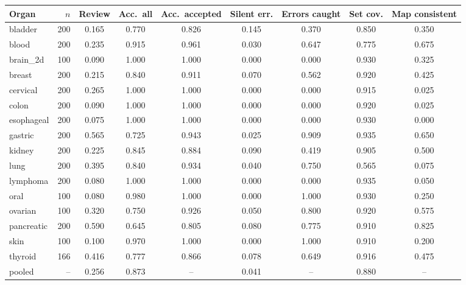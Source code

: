 \begin{tabular}{@{}lrccccccc@{}}
\toprule
Organ & $n$ & Review & Acc.\ all & Acc.\ accepted & Silent err. & Errors caught & Set cov. & Map consistent \\
\midrule
bladder & 200 & 0.165 & 0.770 & 0.826 & 0.145 & 0.370 & 0.850 & 0.350 \\
blood & 200 & 0.235 & 0.915 & 0.961 & 0.030 & 0.647 & 0.775 & 0.675 \\
brain\_2d & 100 & 0.090 & 1.000 & 1.000 & 0.000 & 0.000 & 0.930 & 0.325 \\
breast & 200 & 0.215 & 0.840 & 0.911 & 0.070 & 0.562 & 0.920 & 0.425 \\
cervical & 200 & 0.265 & 1.000 & 1.000 & 0.000 & 0.000 & 0.915 & 0.025 \\
colon & 200 & 0.090 & 1.000 & 1.000 & 0.000 & 0.000 & 0.920 & 0.025 \\
esophageal & 200 & 0.075 & 1.000 & 1.000 & 0.000 & 0.000 & 0.930 & 0.000 \\
gastric & 200 & 0.565 & 0.725 & 0.943 & 0.025 & 0.909 & 0.935 & 0.650 \\
kidney & 200 & 0.225 & 0.845 & 0.884 & 0.090 & 0.419 & 0.905 & 0.500 \\
lung & 200 & 0.395 & 0.840 & 0.934 & 0.040 & 0.750 & 0.565 & 0.075 \\
lymphoma & 200 & 0.080 & 1.000 & 1.000 & 0.000 & 0.000 & 0.935 & 0.050 \\
oral & 100 & 0.080 & 0.980 & 1.000 & 0.000 & 1.000 & 0.930 & 0.250 \\
ovarian & 100 & 0.320 & 0.750 & 0.926 & 0.050 & 0.800 & 0.920 & 0.575 \\
pancreatic & 200 & 0.590 & 0.645 & 0.805 & 0.080 & 0.775 & 0.910 & 0.825 \\
skin & 100 & 0.100 & 0.970 & 1.000 & 0.000 & 1.000 & 0.910 & 0.200 \\
thyroid & 166 & 0.416 & 0.777 & 0.866 & 0.078 & 0.649 & 0.916 & 0.475 \\
\midrule
pooled & -- & 0.256 & 0.873 & -- & 0.041 & -- & 0.880 & -- \\
\bottomrule
\end{tabular}